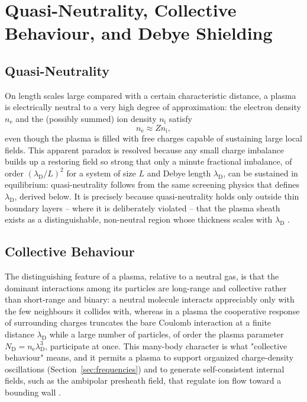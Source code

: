 \section{Quasi-Neutrality, Collective Behaviour, and Debye Shielding}
\label{ch02-sec:debye}

\subsection{Quasi-Neutrality}

On length scales large compared with a certain characteristic distance, a plasma is electrically neutral to a very high degree of approximation: the electron density $n_{\mathrm{e}}$ and the (possibly summed) ion density $n_{\mathrm{i}}$ satisfy
\begin{equation}
n_{\mathrm{e}} \approx Z n_{\mathrm{i}},
\label{eq:quasineutrality}
\end{equation}
even though the plasma is filled with free charges capable of sustaining large local fields. This apparent paradox is resolved because any small charge imbalance builds up a restoring field so strong that only a minute fractional imbalance, of order $(\lambda_{\mathrm{D}}/L)^{2}$ for a system of size $L$ and Debye length $\lambda_{\mathrm{D}}$, can be sustained in equilibrium: quasi-neutrality follows from the same screening physics that defines $\lambda_{\mathrm{D}}$, derived below. It is precisely because quasi-neutrality holds only outside thin boundary layers -- where it is deliberately violated -- that the plasma sheath exists as a distinguishable, non-neutral region whose thickness scales with $\lambda_{\mathrm{D}}$ \cite{ref0013,ref0023}.

\subsection{Collective Behaviour}

The distinguishing feature of a plasma, relative to a neutral gas, is that the dominant interactions among its particles are long-range and collective rather than short-range and binary: a neutral molecule interacts appreciably only with the few neighbours it collides with, whereas in a plasma the cooperative response of surrounding charges truncates the bare Coulomb interaction at a finite distance $\lambda_{\mathrm{D}}$ while a large number of particles, of order the plasma parameter $N_{\mathrm{D}} = n_{\mathrm{e}}\lambda_{\mathrm{D}}^{3}$, participate at once. This many-body character is what "collective behaviour" means, and it permits a plasma to support organized charge-density oscillations (Section~\ref{sec:frequencies}) and to generate self-consistent internal fields, such as the ambipolar presheath field, that regulate ion flow toward a bounding wall \cite{ref0006}.

